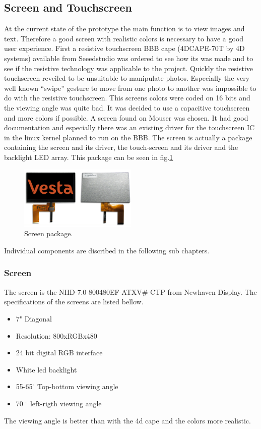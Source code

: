 \clearpage



\subsection{Screen and Touchscreen}
At the current state of the prototype the main function is to view images and text. Therefore a good screen with realistic colors is necessary to have a good user experience.
First a resistive touchscreen BBB cape (4DCAPE-70T by 4D systems) available from Seeedstudio was ordered to see how its was made and to see if the resistive technology was applicable to the project. Quickly the resistive touchscreen reveiled to be unsuitable to manipulate photos. Especially the very well known “swipe” gesture to move from one photo to another was impossible to do with the resistive touchscreen.
This screens colors were coded on 16 bits and the viewing angle was quite bad. It was decided to use a capacitive touchscreen and more colors if possible. A screen found on Mouser was chosen. It had good documentation and especially there was an existing driver for the touchscreen IC in the linux kernel planned to run on the BBB.
 The screen is actually a package containing the screen and its driver, the touch-screen and its driver and the backlight LED array. This package can be seen in fig.\ref{fig:screen package}

 \begin{figure}[!htb]
     \centering
     \includegraphics[width=0.5\textwidth,keepaspectratio]{chap/hardFig/newhaven_screen_image}
     \caption{Screen package.}
     \label{fig:screen package}
 \end{figure}

 Individual components are discribed in the following sub chapters.

\subsubsection{Screen}
The screen is the NHD-7.0-800480EF-ATXV\#-CTP from Newhaven Display. The specifications of the screens are listed bellow.
\begin{itemize}
  \item {7" Diagonal}
  \item{Resolution: 800xRGBx480}
  \item{24 bit digital RGB interface}
  \item{White led backlight}
  \item{55-65$^{\circ}$ Top-bottom viewing angle }
  \item{70 $^{\circ}$ left-rigth viewing angle}
\end{itemize}
The viewing angle is better than with the 4d cape and the colors more realistic.

